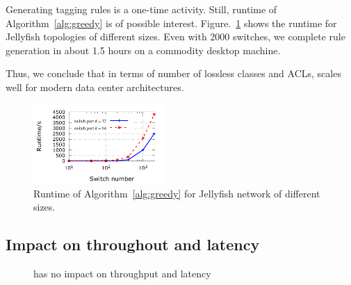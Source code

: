 Generating tagging rules is a one-time activity. Still, runtime of
Algorithm~\ref{alg:greedy} is of possible interest.
Figure.~\ref{fig:algo_runtime} shows the runtime for Jellyfish topologies of
different sizes. Even with 2000 switches, we complete rule generation in about
1.5 hours on a commodity desktop machine.

Thus, we conclude that in terms of number of lossless classes and ACLs,
\sysname{} scales well for modern data center architectures. 

\begin{figure}
	\centering
	\includegraphics[width=0.45\textwidth] {figs/algo_runtime}
	\caption{Runtime of Algorithm~\ref{alg:greedy} for Jellyfish network of different sizes.}
	\label{fig:algo_runtime}
	\vspace{-0.25in}
\end{figure}

\subsection{Impact on throughout and latency}\label{subsec:exp_performanceoverhead}

\begin{figure}[t]
	\centering
	
	
		\caption{\sysname{} has no impact on throughput and latency}
		\label{fig:perf_penalty}
	\vspace{-0.25in}
\end{figure}

